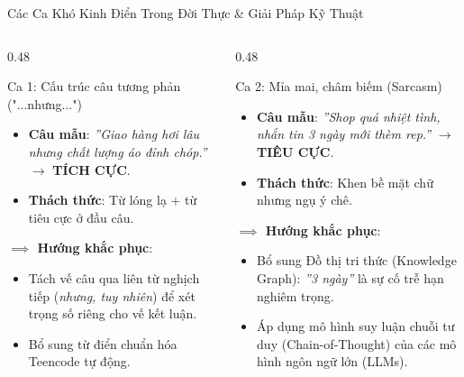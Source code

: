 \documentclass[aspectratio=169, 10pt]{beamer}
\begin{document}
\begin{frame}{Các Ca Khó Kinh Điển Trong Đời Thực \& Giải Pháp Kỹ Thuật}
  \begin{columns}[T, onlytextwidth]
    \begin{column}{0.48\textwidth}
      \begin{block}{Ca 1: Cấu trúc câu tương phản ("...nhưng...")}
        \fontsize{7.5}{9.5}\selectfont
        \begin{itemize}\setlength{\itemsep}{0.15em}
          \item \textbf{Câu mẫu}: \textit{''Giao hàng hơi lâu nhưng chất lượng áo đỉnh chóp.''} $\to$ \textbf{TÍCH CỰC}.
          \item \textbf{Thách thức}: Từ lóng lạ + từ tiêu cực ở đầu câu.
        \end{itemize}
        \vspace{0.08cm}
        \textbf{\color{HCMUEDarkBlue}$\implies$ Hướng khắc phục}:
        \begin{itemize}\fontsize{7}{8.5}\selectfont\setlength{\itemsep}{0.1em}
          \item Tách vế câu qua liên từ nghịch tiếp (\textit{nhưng, tuy nhiên}) để xét trọng số riêng cho vế kết luận.
          \item Bổ sung từ điển chuẩn hóa Teencode tự động.
        \end{itemize}
      \end{block}
    \end{column}
    \hfill
    \begin{column}{0.48\textwidth}
      \begin{alertblock}{Ca 2: Mỉa mai, châm biếm (Sarcasm)}
        \fontsize{7.5}{9.5}\selectfont
        \begin{itemize}\setlength{\itemsep}{0.15em}
          \item \textbf{Câu mẫu}: \textit{''Shop quá nhiệt tình, nhắn tin 3 ngày mới thèm rep.''} $\to$ \textbf{TIÊU CỰC}.
          \item \textbf{Thách thức}: Khen bề mặt chữ nhưng ngụ ý chê.
        \end{itemize}
        \vspace{0.08cm}
        \textbf{\color{HCMUERed}$\implies$ Hướng khắc phục}:
        \begin{itemize}\fontsize{7}{8.5}\selectfont\setlength{\itemsep}{0.1em}
          \item Bổ sung Đồ thị tri thức (Knowledge Graph): \textit{''3 ngày''} là sự cố trễ hạn nghiêm trọng.
          \item Áp dụng mô hình suy luận chuỗi tư duy (Chain-of-Thought) của các mô hình ngôn ngữ lớn (LLMs).
        \end{itemize}
      \end{alertblock}
    \end{column}
  \end{columns}
\end{frame}
\end{document}
